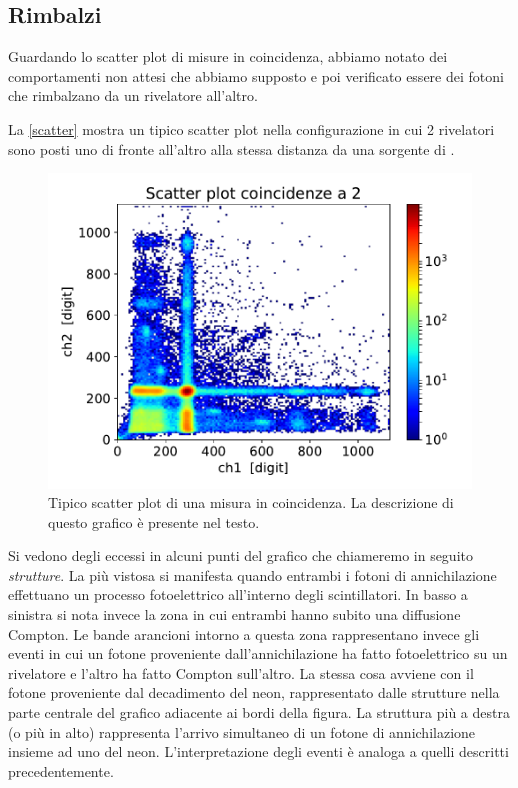 \subsection{Rimbalzi}

Guardando lo scatter plot di misure in coincidenza, abbiamo notato dei comportamenti non attesi che abbiamo supposto e poi verificato essere dei fotoni che rimbalzano da un rivelatore all'altro.

La \autoref{scatter} mostra un tipico scatter plot nella configurazione in cui 2 rivelatori sono posti uno di fronte all'altro alla stessa distanza da una sorgente di \na{}.

\begin{figure}[h]
\centering
\includegraphics[width=\textwidth]{immagini/esempio}
\caption{Tipico scatter plot di una misura in coincidenza. La descrizione di questo grafico è presente nel testo.}
\label{scatter}
\end{figure}


Si vedono degli eccessi in alcuni punti del grafico che chiameremo in seguito \emph{strutture}. La più vistosa si manifesta quando entrambi i fotoni di annichilazione effettuano un processo fotoelettrico all'interno degli scintillatori. In basso a sinistra si nota invece la zona in cui entrambi hanno subito una diffusione Compton. Le bande arancioni intorno a questa zona rappresentano invece gli eventi in cui un fotone proveniente dall'annichilazione ha fatto fotoelettrico su un rivelatore e l'altro ha fatto Compton sull'altro.
La stessa cosa avviene con il fotone proveniente dal decadimento del neon, rappresentato dalle strutture nella parte centrale del grafico adiacente ai bordi della figura. La struttura più a destra (o più in alto) rappresenta l'arrivo simultaneo di un fotone di annichilazione insieme ad uno del neon. L'interpretazione degli eventi è analoga a quelli descritti precedentemente.

